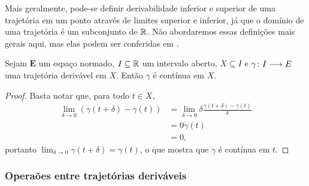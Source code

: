 Mais geralmente, pode-se definir derivabilidade inferior e superior de uma trajetória em um ponto através de limites superior e inferior, já que o domínio de uma trajetória é um subconjunto de $\mathbb{R}$. Não abordaremos essas definições mais gerais aqui, mas elas podem ser conferidas em \cite{liv:Cartan-DifferentialCalculus}.

\begin{proposition}
Sejam $\bm E$ um espaço normado, $I \subseteq \mathbb{R}$ um intervalo aberto, $X \subseteq I$ e ${\gamma}\colon {I} \longrightarrow {E}$ uma trajetória derivável em $X$. Então $\gamma$ é contínua em $X$.
\end{proposition}
\begin{proof}
Basta notar que, para todo $t \in X$,
	\begin{align*}
	\lim_{\delta \to 0} (\gamma(t+\delta)-\gamma(t)) &= \lim_{\delta \to 0} \delta\frac{\gamma(t+\delta)-\gamma(t)}{\delta} \\
		&= 0\dot \gamma(t) \\
		&= 0,
	\end{align*}
portanto $\lim_{\delta \to 0} \gamma(t+\delta) = \gamma(t)$, o que mostra que $\gamma$ é contínua em $t$.
\end{proof}

\subsubsection{Operaões entre trajetórias deriváveis}

